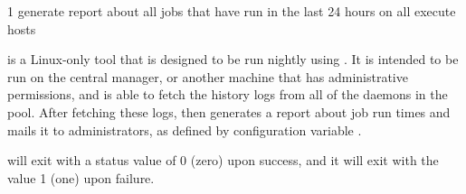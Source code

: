 \begin{ManPage}{\label{man-pool-job-report}}{1}
{generate report about all jobs that have run in the last 24 hours on
all execute hosts}

\Synopsis


\Description

 is a Linux-only 
tool that is designed to be run nightly using .
It is intended to be run on the central manager, 
or another machine that has administrative permissions,
and is able to fetch the  history logs
from all of the  daemons in the pool.
After fetching these logs, 
 then generates a report about job run times
and mails it to administrators, 
as defined by configuration variable .

\ExitStatus

 will exit with a status value of 0 (zero) 
upon success,
and it will exit with the value 1 (one) upon failure.

\end{ManPage}

